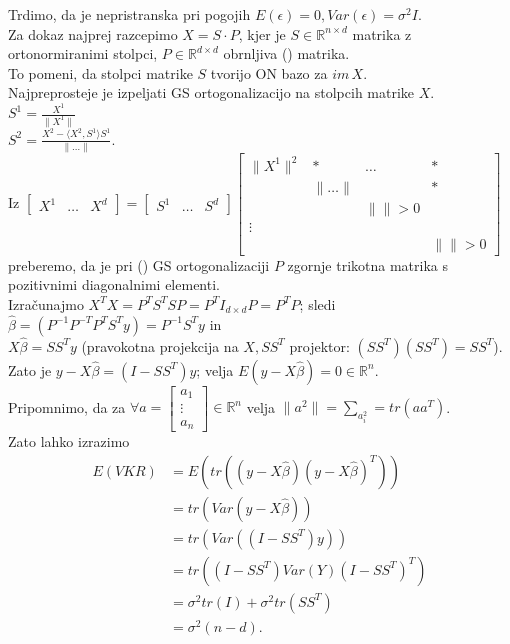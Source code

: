 \documentclass[a4paper, 12pt]{book}
\theoremstyle{definition}
\theoremstyle{remark}
\newcommand{\R}{\mathbb{R}}
\begin{document}
Trdimo, da je nepristranska pri pogojih $E(\epsilon) = 0, Var(\epsilon) = \sigma^2 I$. \\
Za dokaz najprej razcepimo $X = S \cdot P$, kjer je $S \in \R^{n \times d}$ matrika z ortonormiranimi stolpci,
$P \in \R^{d \times d}$ obrnljiva () matrika. \\
To pomeni, da stolpci matrike $S$ tvorijo ON bazo za $im \, X$. \\
Najpreprosteje je izpeljati GS ortogonalizacijo na stolpcih matrike $X$. \\
$S^1 = \frac{X^1}{\lVert X^1 \rVert}$ \\
$S^2 = \frac{X^2 - \langle X^2,S^1\rangle S^1}{\lVert \dots \rVert}$. \\
Iz $\begin{bmatrix}X^1 & \dots & X^d\end{bmatrix} = \begin{bmatrix}S^1 & \dots & S^d\end{bmatrix}
\begin{bmatrix}
  \lVert X^1 \rVert^2 & * & \dots & * \\
  & \lVert \dots \rVert & & * \\
  & & \lVert \rVert > 0 & \\
  \vdots & & & \\
  & & & \lVert \rVert > 0
\end{bmatrix}$ \\
preberemo,
da je pri () GS ortogonalizaciji $P$ zgornje trikotna matrika s pozitivnimi diagonalnimi elementi. \\
Izračunajmo $X^T X = P^T S^T S P = P^T I_{d \times d} P = P^T P$; sledi \\
$\hat{\beta} = (P^{-1} P^{-T} P^T S^T y) = P^{-1} S^T y$ in \\
$X \hat{\beta} = S S^T y$ (pravokotna projekcija na $X, S S^T$ projektor: $(S S^T) (S S^T) = S S^T$). \\
Zato je $y - X \hat{\beta} = (I - S S^T)y$; velja $E(y - X \hat{\beta}) = 0 \in \R^n$. \\
Pripomnimo, da za $\forall a = \begin{bmatrix}a_1 \\ \vdots \\ a_n\end{bmatrix} \in \R^n$ velja
$\lVert a^2 \rVert = \sum_{a_i^2} = tr(a a^T)$. \\
Zato lahko izrazimo
\begin{align*}
  E(VKR) &= E(tr((y - X \hat{\beta}) (y - X \hat{\beta})^T)) \\
  &= tr(Var(y - X \hat{\beta})) \\
  &= tr(Var((I - S S^T) y)) \\
  &= tr((I - S S^T) Var(Y) (I - S S^T)^T) \\
  &= \sigma^2 tr(I) + \sigma^2 tr(S S^T) \\
  &= \sigma^2 (n-d).
\end{align*}
\end{document}
